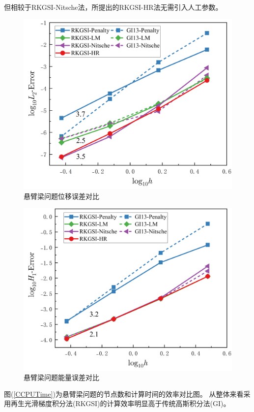 但相较于RKGSI-Nitsche法，所提出的RKGSI-HR法无需引入人工参数。
\begin{figure}[!h]
    \centering
    \includegraphics[scale=0.5]{figure/cantilever/L2.png}
    \caption{悬臂梁问题位移误差对比}\label{CL2}
\end{figure}
\begin{figure}[!h]
    \centering
    \includegraphics[scale=0.5]{figure/cantilever/H1.png}
    \caption{悬臂梁问题能量误差对比}\label{CH1}
\end{figure}\newpage
图(\ref{CCPUTime})为悬臂梁问题的节点数和计算时间的效率对比图。
从整体来看采用再生光滑梯度积分法(RKGSI)的计算效率明显高于传统高斯积分法(GI)。\par
